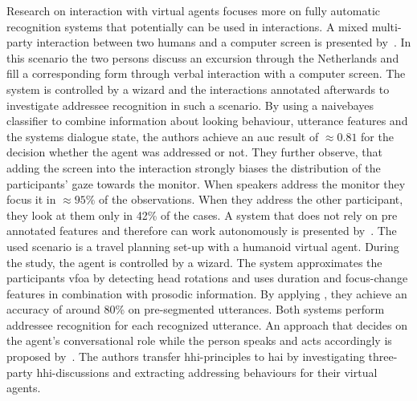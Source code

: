 Research on interaction with \glspl{virtual agent} focuses more on fully automatic recognition systems that potentially can be used in interactions.
A mixed multi-party interaction between two humans and a computer screen is presented by~.
In this scenario the two persons discuss an excursion through the Netherlands and fill a corresponding form through verbal interaction with a computer screen.
The system is controlled by a \gls{wizard} and the interactions annotated afterwards to investigate \gls{addressee} recognition in such a scenario.
By using a \gls{naivebayes} classifier to combine information about looking behaviour, utterance features and the systems dialogue state, the authors achieve an \gls{auc} result of \(\approx 0.81\) for the decision whether the agent was addressed or not.
They further observe, that adding the screen into the interaction strongly biases the distribution of the participants' gaze towards the monitor.
When \glspl{speaker} address the monitor they focus it in \(\approx 95\%\) of the observations.
When they address the other participant, they look at them only in 42\% of the cases.
A system that does not rely on pre annotated features and therefore can work autonomously is presented by~.
The used scenario is a travel planning set-up with a humanoid \gls{virtual agent}.
During the study, the agent is controlled by a \gls{wizard}.
The system approximates the participants \gls{vfoa} by detecting head rotations and uses duration and focus-change features in combination with prosodic information.
By applying , they achieve an \gls{accuracy} of around 80\% on pre-segmented utterances.
Both systems perform \gls{addressee} recognition for each recognized utterance.
An approach that decides on the agent's \gls{conversational role} while the person speaks and acts accordingly is proposed by~.
The authors transfer \gls{hhi}-principles to \gls{hai} by investigating three-party \gls{hhi}-discussions and extracting addressing behaviours for their \glspl{virtual agent}.
